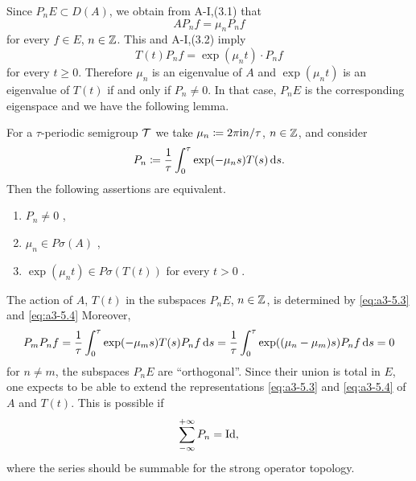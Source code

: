 Since $P_{n}E \subset D(A)$, we obtain from A-I,(3.1) that
\begin{equation}\label{eq:a3-5.3}
AP_{n}f = \mu_{n}P_{n}f
\end{equation}
for every $f \in E$, $n \in \mathbb{Z}$.
This and A-I,(3.2) imply
\begin{equation}\label{eq:a3-5.4}
T(t)P_{n}f = \exp(\mu_{n}t) \cdot P_{n}f
\end{equation}
for every $t \geq 0$.
Therefore $\mu_{n}$ is an eigenvalue of $A$ and $\exp(\mu_{n}t)$ is an eigenvalue of $T(t)$ if and only if $P_{n} \neq 0$.
In that case, $P_{n}E$ is the corresponding eigenspace and we have the following lemma.
\begin{lemma}\label{lem:a3-5.3}
For a $\tau$-periodic semigroup $\mathcal{T}$ we take $\mu_{n} \coloneqq 2\pi\mathrm{i} n/\tau$, $n \in \mathbb{Z}$, and consider
\[
P_{n} \coloneqq \frac{1}{\tau}\int_{0}^{\tau} \exp(-\mu_{n}s)T(s)  \mathop{}\!\mathrm{d}{s} .
\]
Then the following assertions are equivalent.
\begin{enumerate}[\upshape (a)]
\item 
$P_{n} \neq 0$ ,

\item 
$\mu_{n} \in P\sigma(A)$ ,

\item 
$\exp(\mu_{n}t) \in P\sigma(T(t))$ for every $t > 0$ .

\end{enumerate}
\end{lemma}
The action of $A$, \resp $T(t)$ in the subspaces $P_{n}E$, $n \in \mathbb{Z}$, is determined by \eqref{eq:a3-5.3} and \eqref{eq:a3-5.4} \resp
Moreover,
\[
	P_{m}P_{n}f =  \frac{1}{\tau}\int_{0}^{\tau} \exp(-\mu_{m}s)T(s)P_{n}f  \mathop{}\!\mathrm{d}{s} 
	=  \frac{1}{\tau}\int_{0}^{\tau} \exp((\mu_{n}-\mu_{m})s)P_{n}f  \mathop{}\!\mathrm{d}{s} = 0
\]
for $n \neq m$, the subspaces $P_{n}E$ are \enquote{orthogonal}.
Since their union is total in $E$, one expects to be able to extend the representations \eqref{eq:a3-5.3} and \eqref{eq:a3-5.4} of $A$ and $T(t)$.
This is possible if
\[
	\sum_{-\infty}^{+\infty} P_{n} = \operatorname{Id} ,
\]
where the series should be summable for the strong operator topology.

